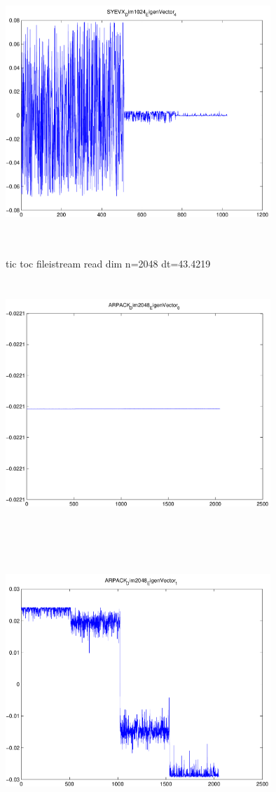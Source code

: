 \documentclass[9pt]{article}
\theoremstyle{plain}
\theoremstyle{definition}
\theoremstyle{remark}
\numberwithin{equation}{section}
\begin{document}
\includegraphics[width=10.0cm,height=10.0cm]{SYEVX_Dim1024_EigenVector_4.pdf}

tic toc fileistream read dim n=2048 dt=43.4219
\includegraphics[width=10.0cm,height=10.0cm]{ARPACK_Dim2048_EigenVector_0.pdf}

\includegraphics[width=10.0cm,height=10.0cm]{ARPACK_Dim2048_EigenVector_1.pdf}
\end{document}
